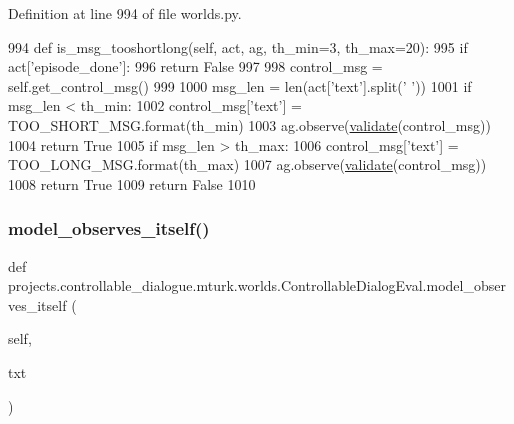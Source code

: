 Definition at line 994 of file worlds.\+py.


\begin{DoxyCode}
994     \textcolor{keyword}{def }is\_msg\_tooshortlong(self, act, ag, th\_min=3, th\_max=20):
995         \textcolor{keywordflow}{if} act[\textcolor{stringliteral}{'episode\_done'}]:
996             \textcolor{keywordflow}{return} \textcolor{keyword}{False}
997 
998         control\_msg = self.get\_control\_msg()
999 
1000         msg\_len = len(act[\textcolor{stringliteral}{'text'}].split(\textcolor{stringliteral}{' '}))
1001         \textcolor{keywordflow}{if} msg\_len < th\_min:
1002             control\_msg[\textcolor{stringliteral}{'text'}] = TOO\_SHORT\_MSG.format(th\_min)
1003             ag.observe(\hyperlink{namespaceparlai_1_1core_1_1worlds_afc3fad603b7bce41dbdc9cdc04a9c794}{validate}(control\_msg))
1004             \textcolor{keywordflow}{return} \textcolor{keyword}{True}
1005         \textcolor{keywordflow}{if} msg\_len > th\_max:
1006             control\_msg[\textcolor{stringliteral}{'text'}] = TOO\_LONG\_MSG.format(th\_max)
1007             ag.observe(\hyperlink{namespaceparlai_1_1core_1_1worlds_afc3fad603b7bce41dbdc9cdc04a9c794}{validate}(control\_msg))
1008             \textcolor{keywordflow}{return} \textcolor{keyword}{True}
1009         \textcolor{keywordflow}{return} \textcolor{keyword}{False}
1010 
\end{DoxyCode}
\mbox{\label{classprojects_1_1controllable__dialogue_1_1mturk_1_1worlds_1_1ControllableDialogEval_a196c0350ae2204d7949f8ae177bd07bc}} 
\subsubsection{\texorpdfstring{model\+\_\+observes\+\_\+itself()}{model\_observes\_itself()}}
{\footnotesize\ttfamily def projects.\+controllable\+\_\+dialogue.\+mturk.\+worlds.\+Controllable\+Dialog\+Eval.\+model\+\_\+observes\+\_\+itself (\begin{DoxyParamCaption}\item[{}]{self,  }\item[{}]{txt }\end{DoxyParamCaption})}



